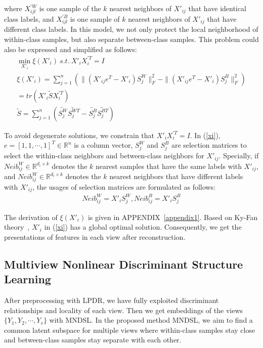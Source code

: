 \documentclass[journal]{IEEEtran}
\begin{document}
where $X_{ijl}^{'W}$ is one sample of the $k$ nearest neighbors of $X'_{ij}$ that have identical class labels, and $X_{ijl}^{'B}$ is one sample of $k$ nearest neighbors of $X'_{ij}$ that have different class labels. 
In this model, we not only protect the local neighborhood of within-class samples, but also separate between-class samples. 
This problem could also be expressed and simplified as follows:
\begin{gather}
\min_{X'_i} \xi (X'_i) \ s.t.\ X'_iX_i^{'T}=I \nonumber \\
\xi(X'_i) = \sum_{j=1}^n (\| (X'_{ij}e^T-X'_i)S_j^W \|_F^2  - \|(X'_{ij}e^T-X'_i)S_j^B\|_F^2 ) \nonumber \\
\label{xi}
= tr( X'_i \tilde{S} X_i^{'T} ) \\ 
\tilde{S} = \sum_{j=1}^n (\tilde{S_j^{W}} \tilde{S_j^{WT}} - \tilde{S_j^{B}} \tilde{S_j^{BT}}) \nonumber
\end{gather}

To avoid degenerate solutions, we constrain that $X'_iX_i^{'T}=I$. 
In (\ref{xi}), $e = [1,1,\cdots, 1]^T \in \mathbb{R}^{n}$ is a column vector, $S_j^W$ and $S_j^B$ are selection matrices to select the within-class neighbors and between-class neighbors for $X'_{ij}$. 
Specially, if $Neib_{ij}^W\in \mathbb{R}^{d_i\times k}$ denotes the $k$ nearest samples that have the same labels with $X'_{ij}$, and $Neib_{ij}^W\in \mathbb{R}^{d_i\times k} $ denotes the $k$ nearest neighbors that have different labels with $X'_{ij}$, the usages of selection matrices are formulated as follows: 
\begin{gather}
Neib_{ij}^W = X'_i {S_j^{W}},Neib_{ij}^B = X'_i {S_j^{B}} 
\end{gather}

The derivation of $\xi(X'_i)$ is given in APPENDIX~\ref{appendix1}. 
Based on Ky-Fan theory~\cite{KyFan}, $X'_i$ in (\ref{xi}) has a global optimal solution. 
Consequently, we get the presentations of features in each view after reconstruction. 


\subsection{Multiview Nonlinear Discriminant Structure Learning} \label{MNDSLsection}
After preprocessing with LPDR, we have fully exploited discriminant relationships and locality of each view. 
Then we get embeddings of the views $\{Y_1,Y_2,\cdots, Y_v \}$ with MNDSL. 
In the proposed method MNDSL, we aim to find a common latent subspace for multiple views where within-class samples stay close and between-class samples stay separate with each other. 
\end{document}
